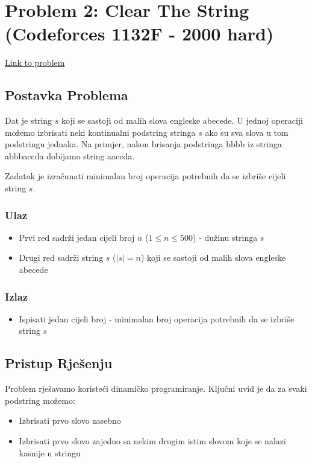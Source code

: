 \section{Problem 2: Clear The String (Codeforces 1132F - 2000 hard)}
\href{https://codeforces.com/problemset/problem/1132/F}{Link to problem}

\subsection{Postavka Problema}
Dat je string $s$ koji se sastoji od malih slova engleske abecede. U jednoj operaciji možemo izbrisati neki kontinualni podstring stringa $s$ ako su sva slova u tom podstringu jednaka. Na primjer, nakon brisanja podstringa bbbb iz stringa abbbaccda dobijamo string aaccda.

Zadatak je izračunati minimalan broj operacija potrebnih da se izbriše cijeli string $s$.

\subsubsection{Ulaz}
\begin{itemize}
    \item Prvi red sadrži jedan cijeli broj $n$ ($1 \leq n \leq 500$) - dužinu stringa $s$
    \item Drugi red sadrži string $s$ ($|s| = n$) koji se sastoji od malih slova engleske abecede
\end{itemize}

\subsubsection{Izlaz}
\begin{itemize}
    \item Ispisati jedan cijeli broj - minimalan broj operacija potrebnih da se izbriše string $s$
\end{itemize}

\subsection{Pristup Rješenju}
Problem rješavamo koristeći dinamičko programiranje. Ključni uvid je da za svaki podstring možemo:
\begin{itemize}
    \item Izbrisati prvo slovo zasebno
    \item Izbrisati prvo slovo zajedno sa nekim drugim istim slovom koje se nalazi kasnije u stringu
\end{itemize}

